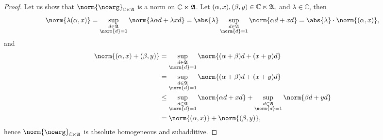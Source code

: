 \begin{proof}
    Let us show that \(\norm{\noarg}_{\mathbb{C}\ltimes\algebra{A}}\) is a norm on \(\mathbb{C} \ltimes \mathfrak{A}\).  Let \((\alpha, x), (\beta, y) \in \mathbb{C} \ltimes \mathfrak{A},\) and \(\lambda \in \mathbb{C}\), then
    \begin{equation*}
        \norm{\lambda (\alpha, x)} = \sup_{\substack{d \in \algebra{A}\\\norm{d} = 1}}{\norm{\lambda\alpha d + \lambda xd}} = \abs{\lambda}\sup_{\substack{d \in \algebra{A}\\\norm{d} = 1}}{\norm{\alpha d + xd}} = \abs{\lambda}\cdot\norm{(\alpha, x)},
    \end{equation*}
    and
    \begin{align*}
        \norm{(\alpha, x) + (\beta, y)} &= \sup_{\substack{d \in \algebra{A}\\\norm{d} = 1}}{\norm{(\alpha + \beta)d + (x + y)d}}\\
                                        &= \sup_{\substack{d \in \algebra{A}\\\norm{d} = 1}}{\norm{(\alpha + \beta)d + (x + y)d}}\\
                                        &\leq \sup_{\substack{d \in \algebra{A}\\\norm{d} = 1}}{\norm{\alpha d + x d}} + \sup_{\substack{d \in \algebra{A}\\\norm{d} = 1}}{\norm{\beta d + yd}}\\
                                        &= \norm{(\alpha, x)} + \norm{(\beta, y)},
    \end{align*}
    hence \(\norm{\noarg}_{\mathbb{C} \ltimes \algebra{A}}\) is absolute homogeneous and subadditive.


\end{proof}
